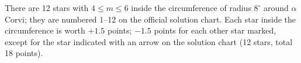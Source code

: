 There are 12 stars with $4 \le m \le 6$ inside the circumference of radius
$8^\circ$ around $\alpha$ Corvi; they are numbered 1--12 on the official
solution chart. Each star inside the circumference is worth $+1.5$ points;
$-1.5$ points for each other star marked, except for the star indicated with
an arrow on the solution chart (12 stars, total 18 points).

